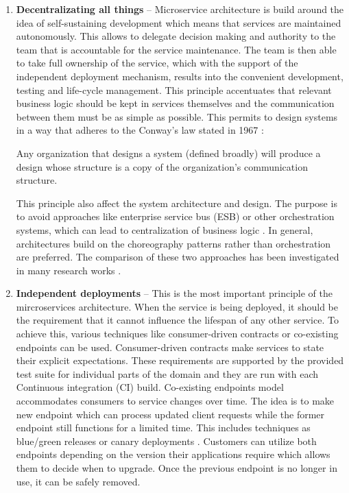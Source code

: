 \documentclass[oneside,
  digital, %
  table,   %
  lof,     %
  lot,     %
]{fithesis3}
\begin{document}
\begin{enumerate}
	\item \textbf{Decentralizating all things} -- Microservice architecture is build around the idea of self-sustaining development which means that services are maintained autonomously. This allows to delegate decision making and authority to the team that is accountable for the service maintenance. The team is then able to take full ownership of the service, which with the support of the independent deployment mechanism, results into the convenient development, testing and life-cycle management. This principle accentuates that relevant business logic should be kept in services themselves and the communication between them must be as simple as possible. This permits to design systems in a way that adheres to the Conway's law  stated in 1967 \cite{conways_law}:
    
    \begin{displayquote}
       Any organization that designs a system (defined broadly) will produce a design whose structure is a copy of the organization's communication structure.
    \end{displayquote}

    This principle also affect the system architecture and design. The purpose is to avoid approaches like enterprise service bus (ESB) or other orchestration systems, which can lead to centralization of business logic \cite{building_ms}. In general, architectures build on the choreography patterns rather than orchestration are preferred. The comparison of these two approaches has been investigated in many research works \cite{chor_and_orch, service_oriented_design, realtime_ws_orch}.
	
	\item \textbf{Independent deployments} -- This is the most important principle of the mircroservices architecture. When the service is being deployed, it should be the requirement that it cannot influence the lifespan of any other service. To achieve this, various techniques like consumer-driven contracts or co-existing endpoints can be used. Consumer-driven contracts make services to state their explicit expectations. These requirements are supported by the provided test suite for individual parts of the domain and they are run with each Continuous integration (CI) build. Co-existing endpoints model accommodates consumers to service changes over time. The idea is to make new endpoint which can process updated client requests while the former endpoint still functions for a limited time. This includes techniques as blue/green releases \cite{blue_green} or canary deployments \cite{canary_deploy}. Customers can utilize both endpoints depending on the version their applications require which allows them to decide when to upgrade. Once the previous endpoint is no longer in use, it can be safely removed.
	

\end{enumerate}
\end{document}

